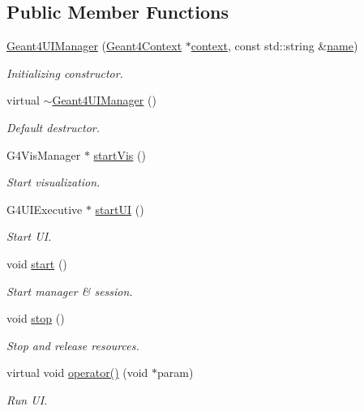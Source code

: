 \subsection*{Public Member Functions}
\begin{DoxyCompactItemize}
\item 
\hyperlink{class_d_d4hep_1_1_simulation_1_1_geant4_u_i_manager_a80b987d5f8456101424ab3c4ac69c08e}{Geant4\+U\+I\+Manager} (\hyperlink{class_d_d4hep_1_1_simulation_1_1_geant4_context}{Geant4\+Context} $\ast$\hyperlink{class_d_d4hep_1_1_simulation_1_1_geant4_action_aa9d87f0ec2a72b7fc2591b18f98d75cf}{context}, const std\+::string \&\hyperlink{class_d_d4hep_1_1_simulation_1_1_geant4_action_af374e70b014d16afb81dd9d77cc3894b}{name})
\begin{DoxyCompactList}\small\item\em Initializing constructor. \end{DoxyCompactList}\item 
virtual \hyperlink{class_d_d4hep_1_1_simulation_1_1_geant4_u_i_manager_af668d960c771504a66490bdf8f0aebd8}{$\sim$\+Geant4\+U\+I\+Manager} ()
\begin{DoxyCompactList}\small\item\em Default destructor. \end{DoxyCompactList}\item 
G4\+Vis\+Manager $\ast$ \hyperlink{class_d_d4hep_1_1_simulation_1_1_geant4_u_i_manager_a70ee5c55162faf4f3b77843449c8e799}{start\+Vis} ()
\begin{DoxyCompactList}\small\item\em Start visualization. \end{DoxyCompactList}\item 
G4\+U\+I\+Executive $\ast$ \hyperlink{class_d_d4hep_1_1_simulation_1_1_geant4_u_i_manager_a9992d662309b9d5bcd67fba232801738}{start\+UI} ()
\begin{DoxyCompactList}\small\item\em Start UI. \end{DoxyCompactList}\item 
void \hyperlink{class_d_d4hep_1_1_simulation_1_1_geant4_u_i_manager_af092b336d49fbb7cf68f41b60b4dc88d}{start} ()
\begin{DoxyCompactList}\small\item\em Start manager \& session. \end{DoxyCompactList}\item 
void \hyperlink{class_d_d4hep_1_1_simulation_1_1_geant4_u_i_manager_ab6f7bb12343b10b7d5ea19a422ad9718}{stop} ()
\begin{DoxyCompactList}\small\item\em Stop and release resources. \end{DoxyCompactList}\item 
virtual void \hyperlink{class_d_d4hep_1_1_simulation_1_1_geant4_u_i_manager_a3b883391f9b66b1620c0ba44406b3247}{operator()} (void $\ast$param)
\begin{DoxyCompactList}\small\item\em Run UI. \end{DoxyCompactList}\end{DoxyCompactItemize}
